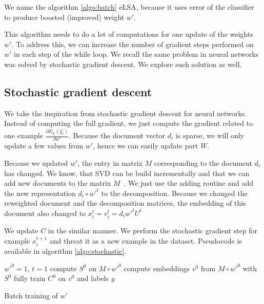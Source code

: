     We name the algorithm \ref{algo:batch} eLSA, because it uses error of the classifier to produce boosted (improved) weight $w'$.
    
    This algorithm needs to do a lot of computations for one update of the weights $w'$.
    To address this, we can increase the number of gradient steps performed on $w'$ in each step of the while loop.
    We recall the same problem in neural networks was solved by stochastic gradient descent.
    We explore such solution as well.
    
    \subsection{Stochastic gradient descent}
    
    We take the inspiration from stochastic gradient descent for neural networks.
    Instead of computing the full gradient, we just compute the gradient related to one example $\frac{\partial E_{y_i}(\hat{y_i})}{\partial w'}$.
    Because the document vector $d_i$ is sparse, we will only update a few values from $w'$, hence we can easily update part $W$.
    
    Because we updated $w'$, the entry in matrix $M$ corresponding to the document $d_i$ has changed.
    We know, that SVD can be build incrementally and that we can add new documents to the matrix $M$~\cite{brand2006fast}.
    We just use the adding routine and add the new representation $d_i \circ w'^{t}$ to the decomposition.
    Because we changed the reweighted document and the decomposition matrices,
    the embedding of this document also changed to 
    $x_i^{t} = v_i^{t} = d_i w'^{t} U^{t}$
    
    We update $C$ in the similar manner.
    We perform the stochastic gradient step for example $x_i^{t+1}$ and threat it as a new example in the dataset.
    Pseudocode is available in algorithm \ref{algo:stochastic}.
    
    \begin{algorithm}[H]
        $w'^0 = 1$, $t=1$\;
        compute $S^0$ on $M \circ w'^{0}$\;
        compute embeddings $v^0$ from $M \circ w'^{0}$ with $S^0$\;
        fully train $C^0$ on $v^0$ and labels $y$\;
        
        \caption{Batch training of $w'$} \label{algo:stochastic}
    \end{algorithm}
    
